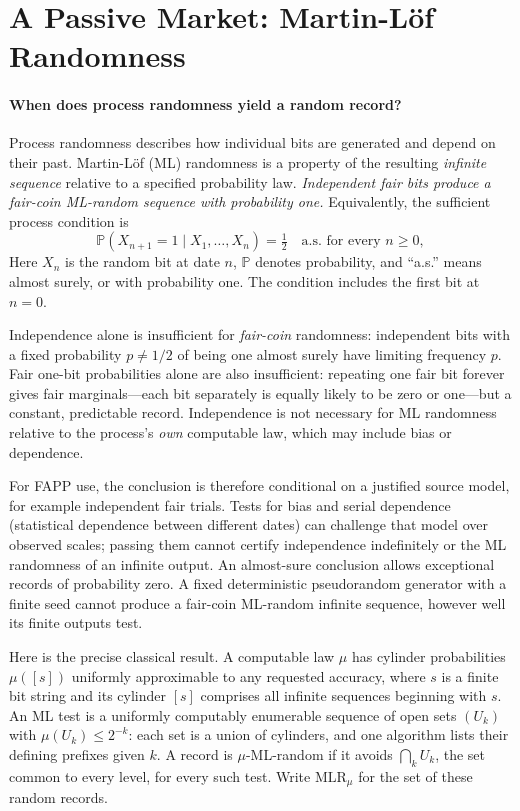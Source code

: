 \documentclass[aps,pra,reprint,superscriptaddress,amsmath,amssymb,floatfix]{revtex4-2}
\theoremstyle{plain}
\theoremstyle{definition}
\theoremstyle{remark}
\begin{document}
\section{A Passive Market: Martin-L\"of Randomness}
\label{sec:randomness}

\paragraph{When does process randomness yield a random record?}

Process randomness describes how individual bits are generated and depend on
their past. Martin-L\"of (ML) randomness is a property of the resulting
\emph{infinite sequence} relative to a specified probability law.
\emph{Independent fair bits produce a fair-coin ML-random sequence with
probability one.} Equivalently, the sufficient process condition is
\begin{equation}
  \mathbb P(X_{n+1}=1\mid X_1,\ldots,X_n)=\tfrac12
  \quad\text{a.s. for every }n\geq0,
  \label{eq:conditional-fairness}
\end{equation}
Here \(X_n\) is the random bit at date \(n\), \(\mathbb P\) denotes
probability, and ``a.s.'' means almost surely, or with probability one. The
condition includes the first bit at \(n=0\).

Independence alone is insufficient for \emph{fair-coin} randomness: independent
bits with a fixed probability \(p\neq1/2\) of being one almost surely have
limiting frequency \(p\).
Fair one-bit probabilities alone are also insufficient: repeating one fair
bit forever gives fair marginals---each bit separately is equally likely to
be zero or one---but a constant, predictable record.
Independence is not necessary for ML randomness relative to the process's
\emph{own} computable law, which may include bias or dependence.

For FAPP use, the conclusion is therefore conditional on a justified source
model, for example independent fair trials. Tests for bias and serial dependence (statistical dependence between different
dates) can challenge that model over observed scales; passing them cannot
certify independence indefinitely or the ML randomness of an infinite output.
An almost-sure conclusion allows exceptional records of probability zero.
A fixed deterministic pseudorandom generator with a finite seed cannot produce
a fair-coin ML-random infinite sequence, however well its finite outputs test.

Here is the precise classical result. A computable law \(\mu\) has cylinder
probabilities \(\mu([s])\) uniformly approximable to any requested accuracy,
where \(s\) is a finite bit string and its cylinder \([s]\) comprises all
infinite sequences beginning with \(s\). An ML test is a uniformly computably
enumerable sequence of open sets \((U_k)\) with \(\mu(U_k)\leq2^{-k}\):
each set is a union of cylinders, and one algorithm lists their defining
prefixes given \(k\). A record is \(\mu\)-ML-random if it avoids
\(\bigcap_kU_k\), the set common to every level, for every such test. Write
\(\mathrm{MLR}_\mu\) for the set of these random records.
\end{document}
